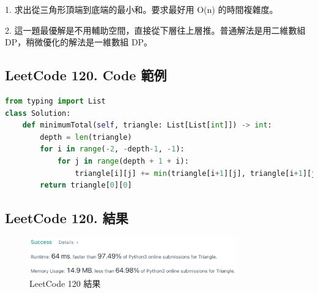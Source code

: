 \documentclass[10pt,UTF8]{ctexart}
\begin{document}
1. 求出從三角形頂端到底端的最小和。要求最好用 O(n) 的時間複雜度。

2. 這一題最優解是不用輔助空間，直接從下層往上層推。普通解法是用二維數組 DP，稍微優化的解法是一維數組 DP。

\subsection{LeetCode 120. Code 範例}

\begin{lstlisting}[language={python}]
from typing import List
class Solution:
    def minimumTotal(self, triangle: List[List[int]]) -> int:
        depth = len(triangle)
        for i in range(-2, -depth-1, -1):
            for j in range(depth + 1 + i):
                triangle[i][j] += min(triangle[i+1][j], triangle[i+1][j+1])
        return triangle[0][0]
\end{lstlisting}

\subsection{LeetCode 120. 結果}

\begin{figure}[H]
\centering 
\includegraphics[width=0.80\textwidth]{lc-120-o.png} 
\caption{LeetCode 120 結果}
\label{Test}
\end{figure}











\clearpage
\end{document}
